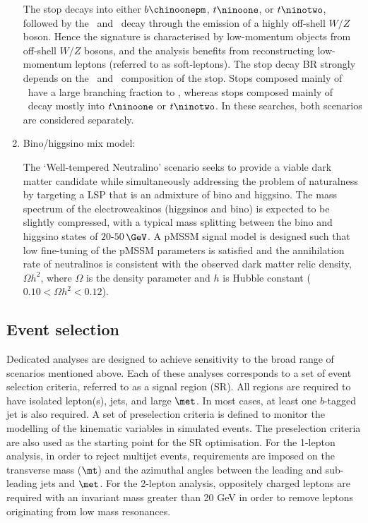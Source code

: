 \documentclass[UKenglish,10pt]{article}
\begin{document}
\begin{enumerate}[label=(\alph*)]
The stop decays into either $b \chinoonepm$, $t \ninoone$, or $t \ninotwo$, followed by the \chinoonepm\ and \ninotwo\ decay through the emission of a highly off-shell $W/Z$ boson. Hence the signature is characterised by low-momentum objects from off-shell $W/Z$ bosons, and the analysis benefits from reconstructing low-momentum leptons (referred to as soft-leptons). The stop decay BR strongly depends on the \tright\ and \tleft\ composition of the stop. Stops composed mainly of \tright\ have a large branching fraction to \bChargino, whereas stops composed mainly of \tleft\ decay mostly into $t \ninoone$ or $t \ninotwo$. In these searches, both scenarios are considered separately.

\item Bino/higgsino mix model:

The `Well-tempered Neutralino' scenario seeks to provide a viable dark matter candidate while simultaneously addressing the problem of naturalness by targeting a LSP that is an admixture of bino and higgsino.  The mass spectrum of the electroweakinos (higgsinos and bino) is expected to be slightly compressed, with a typical mass splitting between the bino and higgsino states of $20$-$50$\,$\GeV$. A pMSSM signal model is designed such that low fine-tuning of the pMSSM parameters is satisfied and the annihilation rate of neutralinos is consistent with the observed dark matter relic density, $\Omega h^2$, where $\Omega$ is the density parameter and $h$ is Hubble constant ($0.10<\Omega h^2<0.12$).

\end{enumerate}

\subsection{Event selection}

Dedicated analyses are designed to achieve sensitivity to the broad range of scenarios mentioned above. Each of these analyses corresponds to a set of event selection criteria, referred to as a signal region (SR). All regions are required to have isolated lepton(s), jets, and large $\met$. In most cases, at least one $b$-tagged jet is also required. A set of preselection criteria is defined to monitor the modelling of the kinematic variables in simulated events. The preselection criteria are also used as the starting point for the SR optimisation. 
For the 1-lepton analysis, in order to reject multijet events, requirements are imposed on the transverse mass ($\mt$) and the azimuthal angles between the leading and sub-leading jets and $\met$. For the 2-lepton analysis, oppositely charged leptons are required with an invariant mass greater than 20 GeV in order to remove leptons originating from low mass resonances.
\end{document}
